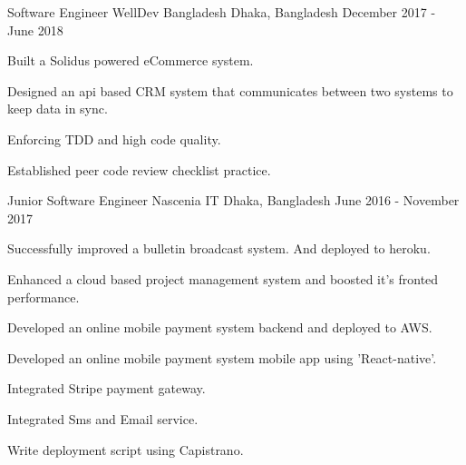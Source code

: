 \begin{cventries}
\cventry
    {Software Engineer}
    {WellDev Bangladesh}
    {Dhaka, Bangladesh}
    {December 2017 - June 2018}
    {
      \begin{cvitemsNumber}[Responsibilities]
        \item {Built a Solidus powered eCommerce system.}
        \vspace{1mm}
        \item {Designed an api based CRM system that communicates between two systems to keep data in sync.}
        \vspace{1mm}
        \item {Enforcing TDD and high code quality.}
        \vspace{1mm}
        \item {Established peer code review checklist practice.}
        \vspace{1mm}
      \end{cvitemsNumber}
    }

\cventry
    {Junior Software Engineer}
    {Nascenia IT}
    {Dhaka, Bangladesh}
    {June 2016 - November 2017}
    {
      \begin{cvitemsNumber}[Responsibilities:]
        \vspace{1mm}
        \item {Successfully improved a bulletin broadcast system. And deployed to heroku.}
        \vspace{1mm}
        \item {Enhanced a cloud based project management system and boosted it's fronted performance.}
        \vspace{1mm}
        \item {Developed an online mobile payment system backend and deployed to AWS.}
        \vspace{1mm}
        \item {Developed an online mobile payment system mobile app using 'React-native'.}
        \vspace{1mm}
        \item {Integrated Stripe payment gateway.}
        \vspace{1mm}
        \item {Integrated Sms and Email service.}
        \vspace{1mm}
        \item {Write deployment script using Capistrano.}
        \vspace{1mm}
      \end{cvitemsNumber}
    }
\end{cventries}
